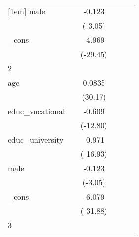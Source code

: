{\begin{tabular}{l*{5}{c}}
[1em]
male        &                     &      -0.123\sym{**} &                     &                     &                     \\
            &                     &     (-3.05)         &                     &                     &                     \\
[1em]
\_cons      &                     &      -4.969\sym{***}&                     &                     &                     \\
            &                     &    (-29.45)         &                     &                     &                     \\
\hline
2           &                     &                     &                     &                     &                     \\
age         &                     &      0.0835\sym{***}&                     &                     &                     \\
            &                     &     (30.17)         &                     &                     &                     \\
[1em]
educ\_vocational&                     &      -0.609\sym{***}&                     &                     &                     \\
            &                     &    (-12.80)         &                     &                     &                     \\
[1em]
educ\_university&                     &      -0.971\sym{***}&                     &                     &                     \\
            &                     &    (-16.93)         &                     &                     &                     \\
[1em]
male        &                     &      -0.123\sym{**} &                     &                     &                     \\
            &                     &     (-3.05)         &                     &                     &                     \\
[1em]
\_cons      &                     &      -6.079\sym{***}&                     &                     &                     \\
            &                     &    (-31.88)         &                     &                     &                     \\
\hline
3           &                     &                     &                     &                     &                     \\

\end{tabular}}

